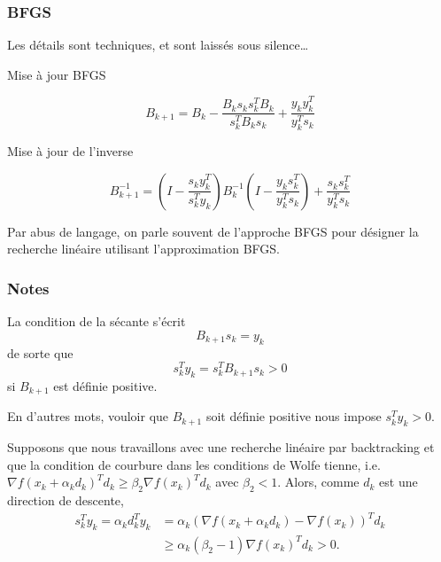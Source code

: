 \documentclass[usepdftitle=false]{beamer}
\def\red{\color{red}}
\begin{document}
\begin{frame}
\frametitle{BFGS}

Les détails sont techniques, et sont laissés sous silence\ldots

\mbox{}

{\red Mise à jour BFGS}

$$
B_{k+1} = B_k - \frac{B_k s_k s_k^T B_k}{s_k^T B_k s_k} + \frac{y_k y_k^T}{y_k^T s_k}
$$

{\red Mise à jour de l'inverse}

$$
B_{k+1}^{-1} = \left( I - \frac{s_k y_k^T}{s_k^T y_k} \right) B_k^{-1}  \left( I - \frac{y_k s_k^T}{y_k^T s_k} \right) + \frac{s_k s_k^T}{y_k^T s_k}
$$

\mbox{}

Par abus de langage, on parle souvent de l'approche BFGS pour désigner la recherche linéaire utilisant l'approximation BFGS.
	
\end{frame}

\begin{frame}
\frametitle{Notes}

La condition de la sécante s'écrit
$$
B_{k+1} s_k = y_k
$$
de sorte que
$$
s_k^T y_k = s_k^T B_{k+1} s_k > 0
$$
si $B_{k+1}$ est définie positive.

\mbox{}

En d'autres mots, vouloir que $B_{k+1}$ soit définie positive nous impose $s_k^T y_k > 0$.

\mbox{}

Supposons que nous travaillons avec une recherche linéaire par backtracking et que la condition de courbure dans les conditions de Wolfe tienne, i.e.
$\nabla f(x_k + \alpha_k d_k )^T d_k \geq \beta_2 \nabla f(x_k)^T d_k$ avec $\beta_2 < 1$. Alors, comme $d_k$ est une direction de descente,
\begin{align*}
s_k^T y_k = \alpha_k d_k^T y_k &= \alpha_k (\nabla f(x_k+\alpha_k d_k)-\nabla f(x_k))^T d_k \\
& \geq \alpha_k(\beta_2-1)\nabla f(x_k)^T d_k > 0.
\end{align*}

\end{frame}
\end{document}
